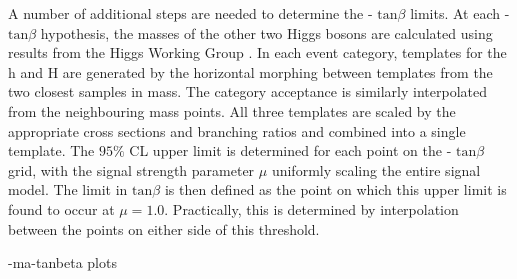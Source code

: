 A number of additional steps are needed to determine the \ma -  $\mathrm{tan}\beta$ limits. At each \ma -  $\mathrm{tan}\beta$ hypothesis, the masses of the other two Higgs bosons are calculated using results from the Higgs Working Group \cite{Dittmaier:1318996}. In each event category, templates for the h and H are generated by the horizontal morphing \cite{READ1999357} between templates from the two closest samples in mass. The category acceptance is similarly interpolated from the neighbouring mass points. All three templates are scaled by the appropriate cross sections and branching ratios and combined into a single template. The $95\%$ CL upper limit is determined for each point on the \ma -  $\mathrm{tan}\beta$ grid, with the signal strength parameter $\mu$ uniformly scaling the entire signal model. The limit in  $\mathrm{tan}\beta$ is then defined as the point on which this upper limit is found to occur at $\mu = 1.0$. Practically, this is determined by interpolation between the points on either side of this threshold.

-ma-tanbeta plots






